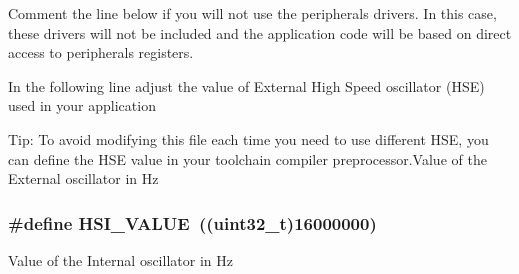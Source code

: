Comment the line below if you will not use the peripherals drivers. In this case, these drivers will not be included and the application code will be based on direct access to peripherals registers. 

In the following line adjust the value of External High Speed oscillator (H\-S\-E) used in your application

Tip\-: To avoid modifying this file each time you need to use different H\-S\-E, you can define the H\-S\-E value in your toolchain compiler preprocessor.\-Value of the External oscillator in Hz \hypertarget{group___library__configuration__section_gaaa8c76e274d0f6dd2cefb5d0b17fbc37}{
\subsubsection[{H\-S\-I\-\_\-\-V\-A\-L\-U\-E}]{\setlength{\rightskip}{0pt plus 5cm}\#define H\-S\-I\-\_\-\-V\-A\-L\-U\-E~((uint32\-\_\-t)16000000)}}\label{group___library__configuration__section_gaaa8c76e274d0f6dd2cefb5d0b17fbc37}
Value of the Internal oscillator in Hz 